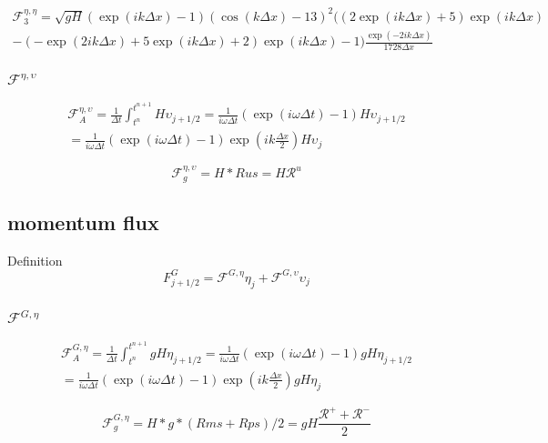 \documentclass[12pt]{article}
\begin{document}
  \begin{multline*}
  \mathcal{F}^{\eta,\eta}_3 = \sqrt{gH}\left(\exp\left(ik\Delta x\right) - 1\right)\left(\cos\left(k\Delta x \right) - 13\right)^2 \Bigg(\left(2\exp\left(ik\Delta x\right) + 5\right)\exp\left(ik\Delta x\right) \\- \left(-\exp\left(2ik\Delta x\right) +5 \exp\left(ik\Delta x\right) + 2\right) \exp\left(ik\Delta x\right) - 1 \Bigg)\frac{\exp\left(-2ik\Delta x\right)}{1728 \Delta x}
  \end{multline*}
 
 
  \subsubsection{$\mathcal{F}^{\eta,\upsilon}$}
  \begin{multline}
\mathcal{F}^{\eta,\upsilon}_A =  \frac{1}{\Delta t} \int_{t^n}^{t^{n+1}} H \upsilon_{j+1/2} = \frac{1}{i \omega \Delta t}\left(\exp\left(i \omega \Delta t\right) - 1\right) H \upsilon_{j+1/2}\\ = \frac{1}{i \omega \Delta t}\left(\exp\left(i \omega \Delta t\right) - 1\right) \exp\left(i k \frac{\Delta x}{2}\right)  H \upsilon_{j}
  \end{multline}

  
  \[\mathcal{F}^{\eta,\upsilon}_g= H*Rus = H \mathcal{R}^u\]
 
 \subsection{momentum flux}
 Definition
 \[F^{G}_{j+1/2} = \mathcal{F}^{G,\eta} \eta_j + \mathcal{F}^{G,\upsilon} \upsilon_j \]
 
  \subsubsection{$\mathcal{F}^{G,\eta}$}
  \begin{multline}
    \mathcal{F}^{G,\eta}_A =  \frac{1}{\Delta t} \int_{t^n}^{t^{n+1}} gH \eta_{j+1/2} = \frac{1}{i \omega \Delta t}\left(\exp\left(i \omega \Delta t\right) - 1\right) gH \eta_{j+1/2}\\ = \frac{1}{i \omega \Delta t}\left(\exp\left(i \omega \Delta t\right) - 1\right) \exp\left(i k \frac{\Delta x}{2}\right) gH \eta_{j}
  \end{multline}
  
  \[\mathcal{F}^{G,\eta}_g = H*g*(Rms + Rps)/2 = gH\frac{\mathcal{R}^+ +  \mathcal{R}^-}{2}\]
  
\end{document}
